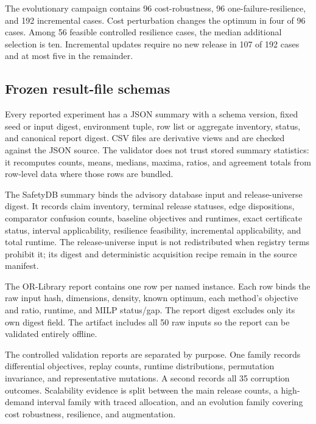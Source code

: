 \documentclass[10pt,conference]{IEEEtran}
\begin{document}
The evolutionary campaign contains 96 cost-robustness, 96 one-failure-resilience, and 192 incremental cases. Cost perturbation changes the optimum in four of 96 cases. Among 56 feasible controlled resilience cases, the median additional selection is ten. Incremental updates require no new release in 107 of 192 cases and at most five in the remainder.


\subsection{Frozen result-file schemas}
Every reported experiment has a JSON summary with a schema version, fixed seed or input digest, environment tuple, row list or aggregate inventory, status, and canonical report digest. CSV files are derivative views and are checked against the JSON source. The validator does not trust stored summary statistics: it recomputes counts, means, medians, maxima, ratios, and agreement totals from row-level data where those rows are bundled.

The SafetyDB summary binds the advisory database input and release-universe digest. It records claim inventory, terminal release statuses, edge dispositions, comparator confusion counts, baseline objectives and runtimes, exact certificate status, interval applicability, resilience feasibility, incremental applicability, and total runtime. The release-universe input is not redistributed when registry terms prohibit it; its digest and deterministic acquisition recipe remain in the source manifest.

The OR-Library report contains one row per named instance. Each row binds the raw input hash, dimensions, density, known optimum, each method's objective and ratio, runtime, and MILP status/gap. The report digest excludes only its own digest field. The artifact includes all 50 raw inputs so the report can be validated entirely offline.

The controlled validation reports are separated by purpose. One family records differential objectives, replay counts, runtime distributions, permutation invariance, and representative mutations. A second records all 35 corruption outcomes. Scalability evidence is split between the main release counts, a high-demand interval family with traced allocation, and an evolution family covering cost robustness, resilience, and augmentation.
\end{document}
